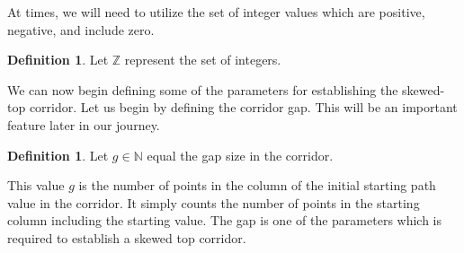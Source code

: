 \documentclass{article}
\newcommand*{\set}[1]{\mathbb{#1}}
\theoremstyle{definition}
\newtheorem{defn}[thm]{Definition}
\begin{document}
  \noindent At times, we will need to utilize the set of integer values which are positive, negative, and include zero. 
  \begin{defn} Let $\set{Z}$ represent the set of integers. \\ \end{defn}
  
  \noindent We can now begin defining some of the parameters for establishing the skewed-top corridor. Let us begin by defining 
  the corridor gap. This will be an important feature later in our journey. 
  \begin{defn} Let $g \in \set{N}$ equal the gap size in the corridor. \end{defn}
  \noindent This value $g$ is the number of points in the column of the initial starting path value in the corridor. It 
  simply counts the number of points in the starting column including the starting value. The gap is one of the parameters 
  which is required to establish a skewed top corridor.

  
\end{document}
